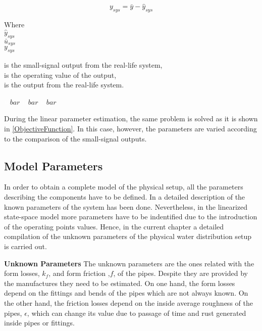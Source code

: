 \begin{equation}
  y_{sys} = \bar{y} - \hat{y}_{sys} 
 \label{u_smallsignal}
\end{equation}

\begin{minipage}[t]{0.20\textwidth}
Where\\
\hspace*{8mm} $\hat{y}_{sys}$ \\
\hspace*{8mm} $\bar{u}_{sys}$ \\
\hspace*{8mm} $y_{sys}$ 
\end{minipage}
\begin{minipage}[t]{0.68\textwidth}
\vspace*{2mm}
is the small-signal output from the real-life system, \\
is the operating value of the output,\\
is the output from the real-life system. 
\end{minipage}
\begin{minipage}[t]{0.10\textwidth}
\vspace*{2mm}
\textcolor{White}{te}$\unit{bar}$
\textcolor{White}{te}$\unit{bar}$
\textcolor{White}{te}$\unit{bar}$
\end{minipage} 

During the linear parameter estimation, the same problem is solved as it is shown in \eqref{ObjectiveFunction}. In this case, however, the parameters are varied according to the comparison of the small-signal outputs.  

\subsection{Model Parameters}
\label{estimateParameters}
In order to obtain a complete model of the physical setup, all the parameters describing the components have to be defined. In  a detailed
description of the known parameters of the system has been done. Nevertheless, in the linearized state-space model more parameters have to be indentified
due to the introduction of the operating points values. Hence, in the current chapter a detailed compilation of the unknown parameters of the physical water distribution setup is carried out.


\textbf{Unknown Parameters}
The unknown parameters are the ones related with the form losses, $k_f$, and form friction ,$f$, of the pipes. Despite they are 
provided by the manufactures they need to be estimated. On one hand, the form losses depend on the fittings and bends of the pipes which are not always known. 
On the other hand, the friction losses depend on the inside average roughness of the pipes, $\epsilon$, which can change its value due to passage of time 
and rust generated inside pipes or fittings. 

